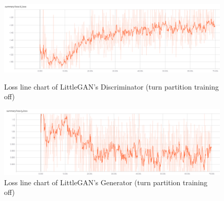 \begin{figure}
    \begin{minipage}[t]{0.49\linewidth}
        \centering
        \includegraphics[width=\textwidth]{figures/loss_part_off_d.png}
        \caption{Loss line chart of LittleGAN's Discriminator (turn partition training off)}
        \label{loss_part_off_d}
    \end{minipage}
        \hfill
    \begin{minipage}[t]{0.49\linewidth}
        \centering
        \includegraphics[width=\textwidth]{figures/loss_part_off_g.png}
        \caption{Loss line chart of LittleGAN's Generator (turn partition training off)}
        \label{loss_part_off_g}
    \end{minipage}
\end{figure}

